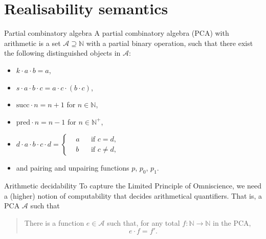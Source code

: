 \documentclass{beamer}
\theoremstyle{definition}
\begin{document}
\section{Realisability semantics}

\begin{frame}{Partial combinatory algebra}
  A partial combinatory algebra (PCA) with arithmetic is a set $\mathcal{A} \supseteq \mathbb{N}$ with a partial binary operation, such that there exist the following distinguished objects in $\mathcal{A}$:
  \begin{itemize}
    \item $k \cdot a \cdot b = a$,
    \item $s \cdot a \cdot b \cdot c = a \cdot c \cdot \left(b \cdot c\right)$,
    \item $\mathrm{succ} \cdot n = n + 1$ for $n \in \mathbb{N}$,
    \item $\mathrm{pred} \cdot n = n - 1$ for $n \in \mathbb{N}^+$,
    \item $d \cdot a \cdot b \cdot c \cdot d = \left\{\begin{aligned}
               & a &  & \text{if } c = d,    \\
               & b &  & \text{if } c \neq d,
            \end{aligned}\right.$
    \item and pairing and unpairing functions $p$, $p_0$, $p_1$.
  \end{itemize}
\end{frame}

\begin{frame}{Arithmetic decidability}
  To capture the Limited Principle of Omniscience, we need a (higher) notion of computability that decides arithmetical quantifiers. That is, a PCA $\mathcal{A}$ such that

  \vspace{1em}

  \begin{quote}
    There is a function $e \in \mathcal{A}$ such that, for any total $f : \mathbb{N} \rightarrow \mathbb{N}$ in the PCA,
    \[e \cdot f = f'.\]
  \end{quote}
\end{frame}
\end{document}

